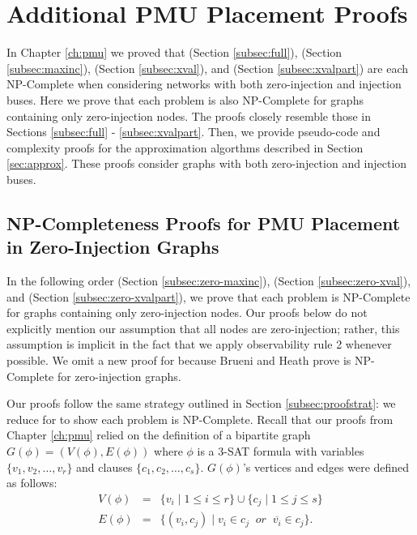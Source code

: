 \chapter{Additional PMU Placement Proofs}
\label{ch:appendix-pmu}


In Chapter \ref{ch:pmu} we proved that \full (Section \ref{subsec:full}), \maxinc (Section \ref{subsec:maxinc}), \xval (Section \ref{subsec:xval}),
and \xvalpart (Section \ref{subsec:xvalpart}) are each NP-Complete when considering networks with both zero-injection and injection buses.  Here we prove that each problem is also NP-Complete
for graphs containing only zero-injection nodes.  The proofs closely resemble those in Sections \ref{subsec:full} - \ref{subsec:xvalpart}. %
Then, we provide pseudo-code and complexity proofs for the approximation algorthms described in Section \ref{sec:approx}.  These proofs consider graphs with both zero-injection and injection buses. 



\section{NP-Completeness Proofs for PMU Placement in Zero-Injection Graphs}

In the following order \maxinc (Section \ref{subsec:zero-maxinc}), \xval (Section \ref{subsec:zero-xval}), and \xvalpart (Section \ref{subsec:zero-xvalpart}), 
we prove that each problem is NP-Complete for graphs containing only zero-injection nodes.  Our proofs below do not explicitly mention our assumption that all nodes 
are zero-injection; rather, %
this assumption is implicit in the fact that we apply observability rule 2 whenever possible.
We omit a new proof for \full because Brueni and Heath \cite{Brueni05} prove \full is NP-Complete for zero-injection graphs.  

Our proofs follow the same strategy outlined in Section \ref{subsec:proofstrat}: we reduce for \sat to show each problem is NP-Complete.  
Recall that our proofs from Chapter \ref{ch:pmu} relied on the definition of a bipartite 
graph $G(\phi)=(V(\phi),E(\phi))$ where $\phi$ is a 3-SAT formula with variables $\{v_1,v_2, \dots , v_r\}$ and clauses $\{c_1,c_2, \dots , c_s \}$.  
$G(\phi)$'s vertices and edges were defined as follows:
\begin{eqnarray*}
 V(\phi) &= &\{v_i\; \vert\; 1 \leq i \leq r \} \cup \{c_j \;\vert\; 1 \leq j \leq s \} \\
 E(\phi) &=& \{ (v_i,c_j)\;\vert\; v_i \in c_j\;\; or \;\; \overline{v_i} \in c_j\}.
\end{eqnarray*}


